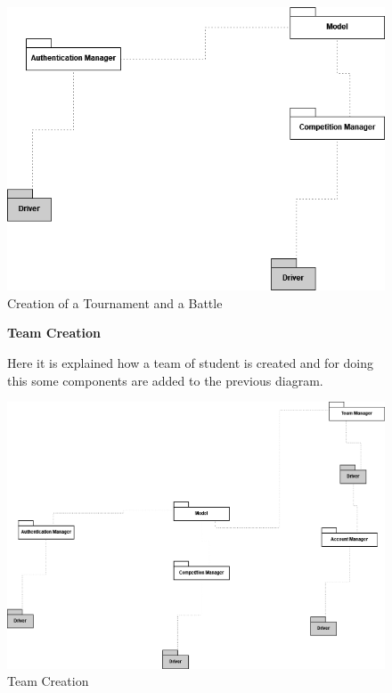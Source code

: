 \begin{enumerate}[label={[\textbf{F\arabic*}]}]
\begin{figure}[!h]
        \centering
        \includegraphics[width=12cm]{Images/Auth+comp.drawio.png}
        \caption{Creation of a Tournament and a Battle}
        \label{fig:Creation of a Tournament and a Battle}
       
    \end{figure}








\begin{figure}[!h]
\item \textbf{Team Creation}

Here it is explained how a team of student is created and for doing this some components are added to the previous diagram.


        \centering
        \includegraphics[width=12cm]{Images/Testing_Team_Creation.drawio.png}
        \caption{Team Creation}
        \label{fig:Team Creation}
       

\end{figure}
\end{enumerate}
